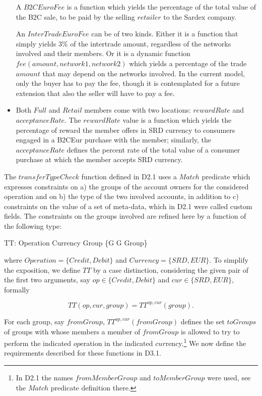 \begin{itemize}
A $B2CEuroFee$ is a function which yields the percentage of the total value of the B2C sale, to be paid by the selling $retailer$ to the Sardex company. 

An $InterTradeEuroFee$ can be of two kinds. Either it is a function that simply yields 3\% of the intertrade amount, regardless of the networks involved and their members. Or it is a dynamic function $fee(amount,network1,network2)$ which yields a percentage of the trade $amount$ that may depend on the networks involved. In the current model, only the buyer has to pay the fee, though it is contemplated for a future extension that also the seller will have to pay a fee.

\item Both $Full$ and $Retail$ members come with two locations: $rewardRate$ and $acceptanceRate$. The $rewardRate$ value is a function which yields the percentage of reward the member offers in SRD currency to consumers engaged in a B2CEur purchase with the member; similarly, the $acceptanceRate$ defines the percent rate of the total value of a consumer purchase at which the member accepts SRD currency.

\end{itemize}

The $transferTypeCheck$ function defined in D2.1 uses a $Match$ predicate which expresses constraints on a) the groups of the account owners for the considered operation and on b) the type of the two involved accounts, in addition to c) constraints on the value of a set of meta-data, which in D2.1 were called custom fields. The constraints on the groups involved are refined here by a function of the following type:
\begin{asm}
TT: Operation \times Currency \times Group \rightarrow \{G \mid G \subseteq Group\}
\end{asm} 
\noindent where $Operation = \{Credit,Debit\}$ and $Currency =\{SRD,EUR\}$.
To simplify the exposition, we define $TT$ by a case distinction, considering the given pair of the first two arguments, say  $op \in \{Credit,Debit\}$ and $cur \in \{SRD,EUR\}$, formally

\[TT(op,cur,group)=TT^{op,cur}(group).\]   

For each group, say $fromGroup$,  $TT^{op,cur}(fromGroup)$ defines the set $toGroups$ of groups with whose members a member of $fromGroup$ is allowed to try to perform the indicated $op$eration in the indicated $cur$rency.\footnote{In D2.1 the names $fromMemberGroup$ and $toMemberGroup$ were used, see the $Match$ predicate definition there.} We now define the requirements described for these functions in D3.1.

